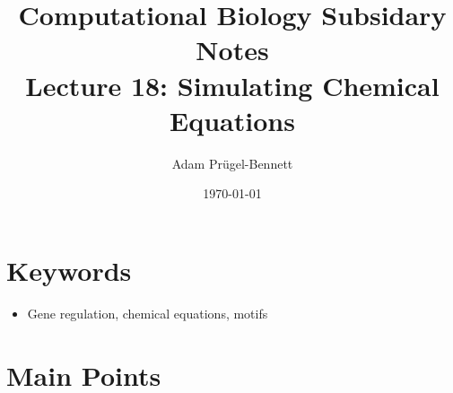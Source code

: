 \documentclass[11pt]{article}
\author{Adam Prügel-Bennett}
\date{\today}
\title{Computational Biology Subsidary Notes\\\medskip
\large Lecture 18: Simulating Chemical Equations}
\begin{document}
\maketitle

\section{Keywords}
\label{sec:orgbc4fc3e}
\begin{itemize}
\item Gene regulation, chemical equations, motifs
\end{itemize}

\section{Main Points}
\label{sec:org638acf6}
\end{document}
